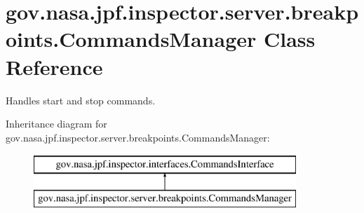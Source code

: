 \hypertarget{classgov_1_1nasa_1_1jpf_1_1inspector_1_1server_1_1breakpoints_1_1_commands_manager}{}\section{gov.\+nasa.\+jpf.\+inspector.\+server.\+breakpoints.\+Commands\+Manager Class Reference}
\label{classgov_1_1nasa_1_1jpf_1_1inspector_1_1server_1_1breakpoints_1_1_commands_manager}


Handles start and stop commands.  


Inheritance diagram for gov.\+nasa.\+jpf.\+inspector.\+server.\+breakpoints.\+Commands\+Manager\+:\begin{figure}[H]
\begin{center}
\leavevmode
\includegraphics[height=2.000000cm]{classgov_1_1nasa_1_1jpf_1_1inspector_1_1server_1_1breakpoints_1_1_commands_manager}
\end{center}
\end{figure}
